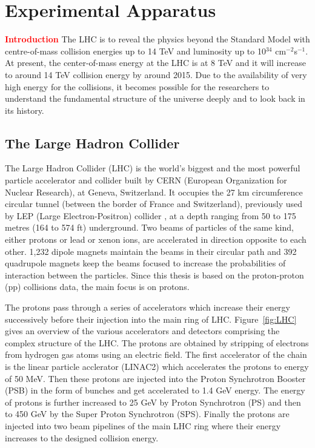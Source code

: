 \chapter{Experimental Apparatus}
\label{chap:Detector}
\textcolor{red}{\bf \large {Introduction}}
The LHC is to reveal the physics beyond the Standard Model with centre-of-mass collision energies up to 14 TeV and luminosity up to 10$^{34}$ cm$^{-2}$s$^{-1}$. At present, the center-of-mass energy at the LHC is at 8 TeV and it will increase to around 14 TeV collision energy by around 2015. Due to the availability of very high energy for the collisions, it becomes possible for the researchers to understand the fundamental structure of the universe deeply and to look back in its history. 

\section{The Large Hadron Collider}
The Large Hadron Collider (LHC) \cite{Evans:2008zzb} is the world's biggest and the most powerful particle accelerator and collider built by CERN (European Organization for Nuclear Research), at Geneva, Switzerland. It occupies the 27 km circumference circular tunnel (between the border of France and Switzerland), previously used by LEP (Large Electron-Positron) collider \cite{LEP}, at a depth ranging from 50 to 175 metres (164 to 574 ft) underground. Two beams of particles of the same kind, either protons or lead or xenon ions, are accelerated in direction opposite to each other. 1,232 dipole magnets maintain the beams in their circular path and 392 quadrupole magnets keep the beams focused to increase the probabilities of interaction between the particles. Since this thesis is based on the proton-proton (pp) collisions data, the main focus is on protons. 

The protons pass through a series of accelerators which increase their energy successively before their injection into the main ring of LHC. Figure~\ref{fig:LHC} gives an overview of the various accelerators and detectors comprising the complex structure of the LHC. The protons are obtained by stripping of electrons from hydrogen gas atoms using an electric field. The first accelerator of the chain is the linear particle acclerator (LINAC2) which accelerates the protons to energy of 50 MeV. Then these protons are injected into the Proton Synchrotron Booster (PSB) in the form of bunches and get accelerated to 1.4 GeV energy. The energy of protons is further increased to 25 GeV by Proton Synchrotron (PS) and then to 450 GeV by the Super Proton Synchrotron (SPS). Finally the protons are injected into two beam pipelines of the main LHC ring where their energy increases to the designed collision energy. 


